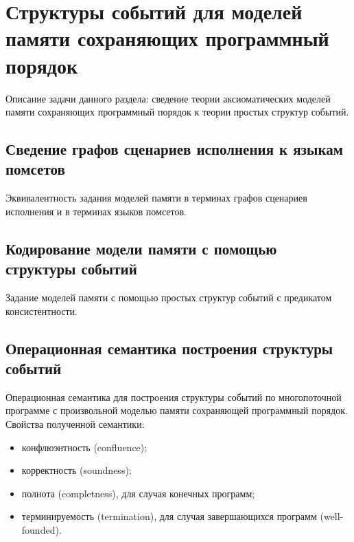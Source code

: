 \chapter{Структуры событий для моделей памяти сохраняющих программный порядок}
\label{ch:porf-evenstruct}

Описание задачи данного раздела:
сведение теории аксиоматических моделей памяти
сохраняющих программный порядок к теории простых структур событий.

\section{Сведение графов сценариев исполнения к языкам помсетов}

Эквивалентность задания моделей памяти в терминах
графов сценариев исполнения и в терминах языков помсетов.

\section{Кодирование модели памяти с помощью структуры событий}

Задание моделей памяти с помощью простых структур событий
с предикатом консистентности. 

\section{Операционная семантика построения структуры событий}

Операционная семантика для построения структуры событий
по многопоточной программе с произвольной моделью памяти
сохраняющей программный порядок.
Свойства полученной семантики:

\begin{itemize}
  \item конфлюэнтность (confluence);
  \item корректность (soundness);
  \item полнота (completness),
    для случая конечных программ;
  \item терминируемость (termination),
    для случая завершающихся программ (well-founded).
\end{itemize}
